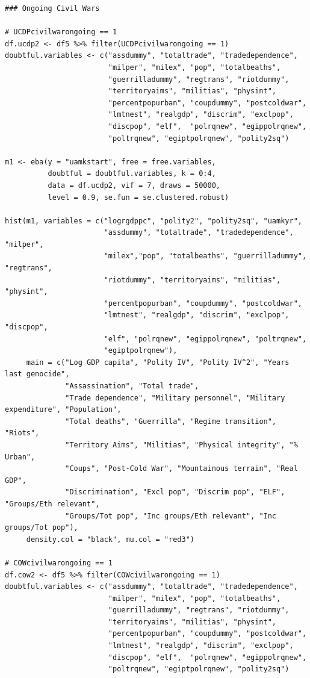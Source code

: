 \documentclass[a4paper,12pt]{article}
\begin{document}
\begin{verbatim}
### Ongoing Civil Wars

# UCDPcivilwarongoing == 1
df.ucdp2 <- df5 %>% filter(UCDPcivilwarongoing == 1)
doubtful.variables <- c("assdummy", "totaltrade", "tradedependence",
                        "milper", "milex", "pop", "totalbeaths",
                        "guerrilladummy", "regtrans", "riotdummy",
                        "territoryaims", "militias", "physint",
                        "percentpopurban", "coupdummy", "postcoldwar",
                        "lmtnest", "realgdp", "discrim", "exclpop",
                        "discpop", "elf",  "polrqnew", "egippolrqnew",
                        "poltrqnew", "egiptpolrqnew", "polity2sq")

m1 <- eba(y = "uamkstart", free = free.variables,
          doubtful = doubtful.variables, k = 0:4,
          data = df.ucdp2, vif = 7, draws = 50000,
          level = 0.9, se.fun = se.clustered.robust)
          
hist(m1, variables = c("logrgdppc", "polity2", "polity2sq", "uamkyr",
                       "assdummy", "totaltrade", "tradedependence", "milper",
                       "milex","pop", "totalbeaths", "guerrilladummy", "regtrans",
                       "riotdummy", "territoryaims", "militias", "physint",
                       "percentpopurban", "coupdummy", "postcoldwar",
                       "lmtnest", "realgdp", "discrim", "exclpop", "discpop",
                       "elf", "polrqnew", "egippolrqnew", "poltrqnew",
                       "egiptpolrqnew"),
     main = c("Log GDP capita", "Polity IV", "Polity IV^2", "Years last genocide",
              "Assassination", "Total trade", 
              "Trade dependence", "Military personnel", "Military expenditure", "Population", 
              "Total deaths", "Guerrilla", "Regime transition", "Riots",
              "Territory Aims", "Militias", "Physical integrity", "% Urban",
              "Coups", "Post-Cold War", "Mountainous terrain", "Real GDP",
              "Discrimination", "Excl pop", "Discrim pop", "ELF", "Groups/Eth relevant", 
              "Groups/Tot pop", "Inc groups/Eth relevant", "Inc groups/Tot pop"),
     density.col = "black", mu.col = "red3")
     
# COWcivilwarongoing == 1
df.cow2 <- df5 %>% filter(COWcivilwarongoing == 1)
doubtful.variables <- c("assdummy", "totaltrade", "tradedependence",
                        "milper", "milex", "pop", "totalbeaths",
                        "guerrilladummy", "regtrans", "riotdummy",
                        "territoryaims", "militias", "physint",
                        "percentpopurban", "coupdummy", "postcoldwar",
                        "lmtnest", "realgdp", "discrim", "exclpop",
                        "discpop", "elf",  "polrqnew", "egippolrqnew",
                        "poltrqnew", "egiptpolrqnew", "polity2sq")


\end{verbatim}
\end{document}
